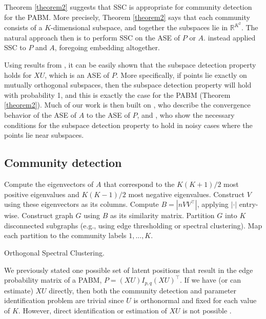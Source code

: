 \documentclass[12pt]{article}
\begin{document}
Theorem \ref{theorem2} suggests that SSC is appropriate for community
detection for the PABM. More precisely, Theorem \ref{theorem2} says that
each community consists of a \(K\)-dimensional subspace, and together
the subspaces lie in \(\mathbb{R}^{K^2}\). The natural approach then is
to perform SSC on the ASE of \(P\) or \(A\).
\citet{noroozi2019estimation} instead applied SSC to \(P\) and
\(A\), foregoing embedding altogether.

Using results from \citet{soltanolkotabi2012}, it can be easily shown
that the subspace detection property holds for \(XU\), which is an ASE
of \(P\). More specifically, if points lie exactly on mutually
orthogonal subspaces, then the subspace detection property will hold
with probability 1, and this is exactly the case for the PABM (Theorem
\ref{theorem2}). Much of our work is then built on
\citet{rubindelanchy2017statistical}, who describe the convergence
behavior of the ASE of \(A\) to the ASE of \(P\), and
\citet{jmlr-v28-wang13}, who show the necessary conditions for the
subspace detection property to hold in noisy cases where the points lie
near subspaces.

\hypertarget{community-detection}{%
\subsection{Community detection}\label{community-detection}}

\begin{algorithm}[t]
  \DontPrintSemicolon
  \SetAlgoLined
    Compute the eigenvectors of $A$ that correspond to the $K (K+1) / 2$ most
    positive eigenvalues and $K (K-1) / 2$ most negative eigenvalues. Construct
    $V$ using these eigenvectors as its columns.\;
    Compute $B = |n V V^\top|$, applying $|\cdot|$ entry-wise.\;
    Construct graph $G$ using $B$ as its similarity matrix.\;
    Partition $G$ into $K$ disconnected subgraphs
    (e.g., using edge thresholding or spectral clustering).\;
    Map each partition to the community labels $1, ..., K$.\;
  \caption{Orthogonal Spectral Clustering.}
\end{algorithm}

We previously stated one possible set of latent positions that result in
the edge probability matrix of a PABM, \(P = (XU) I_{p, q} (XU)^\top\). If
we have (or can estimate) \(XU\) directly, then both the community
detection and parameter identification problem are trivial since \(U\)
is orthonormal and fixed for each value of \(K\). However, direct
identification or estimation of \(XU\) is not possible
\cite{rubindelanchy2017statistical}.
\end{document}
